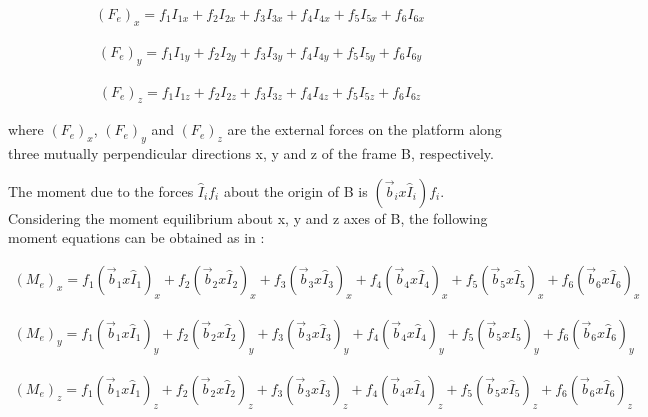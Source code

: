 \begin{ceqn}
	\begin{align}
		(F_e)_x = f_1I_{1x} + f_2I_{2x} + f_3I_{3x} + f_4I_{4x} + f_5I_{5x} + f_6I_{6x}
	\end{align}
\end{ceqn}
\begin{ceqn}
	\begin{align}
		(F_e)_y = f_1I_{1y} + f_2I_{2y} + f_3I_{3y} + f_4I_{4y} + f_5I_{5y} + f_6I_{6y}
	\end{align}
\end{ceqn}
\begin{ceqn}
	\begin{align}
		(F_e)_z = f_1I_{1z} + f_2I_{2z} + f_3I_{3z} + f_4I_{4z} + f_5I_{5z} + f_6I_{6z}
	\end{align}
\end{ceqn}
where $(F_e)_x$, $(F_e)_y$ and $(F_e)_z$ are the external forces on the platform along three mutually perpendicular directions x, y and z of the frame B, respectively.

The moment due to the forces $\hat{I}_if_i$ about the origin of B is $(\vec{b}_i x \hat{I}_i)f_i$. Considering the moment equilibrium about x, y and z axes of B, the following moment equations can be obtained as in \cite{dwarakanath_design_2001}:

\begin{ceqn}
	\begin{align}
		(M_e)_x = f_1(\vec{b}_1 x \hat{I}_1)_x + f_2(\vec{b}_2 x \hat{I}_2)_x + f_3(\vec{b}_3 x \hat{I}_3)_x + f_4(\vec{b}_4 x \hat{I}_4)_x + f_5(\vec{b}_5 x \hat{I}_5)_x + f_6(\vec{b}_6 x \hat{I}_6)_x
	\end{align}
\end{ceqn}
\begin{ceqn}
	\begin{align}
		(M_e)_y = f_1(\vec{b}_1 x \hat{I}_1)_y + f_2(\vec{b}_2 x \hat{I}_2)_y + f_3(\vec{b}_3 x \hat{I}_3)_y + f_4(\vec{b}_4 x \hat{I}_4)_y + f_5(\vec{b}_5 x \hat{I}_5)_y + f_6(\vec{b}_6 x \hat{I}_6)_y
	\end{align}
\end{ceqn}
\begin{ceqn}
	\begin{align}
		(M_e)_z = f_1(\vec{b}_1 x \hat{I}_1)_z + f_2(\vec{b}_2 x \hat{I}_2)_z + f_3(\vec{b}_3 x \hat{I}_3)_z + f_4(\vec{b}_4 x \hat{I}_4)_z + f_5(\vec{b}_5 x \hat{I}_5)_z + f_6(\vec{b}_6 x \hat{I}_6)_z
	\end{align}
\end{ceqn}

